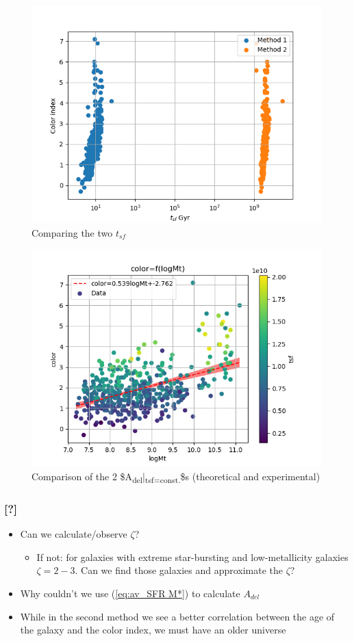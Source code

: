 \documentclass[a4paper,twocolumn]{article}
\begin{document}
\begin{figure}[!htpb]
\centering
\includegraphics[width=.9\linewidth]{./figs/tsf_tsf2.png}
\caption{\label{fig:Comparing the two $t_{sf}$}Comparing the two \(t_{sf}\)}
\end{figure}
\begin{figure}[!htpb]
\centering
\includegraphics[width=.9\linewidth]{./figs/logMt-color-color_tsf.png}
\caption{\label{fig:A_theor_A_exp_tsf}Comparison of the 2 \$A\textsubscript{del}|\textsubscript{tsf=const.}\$s (theoretical and experimental)}
\end{figure}

\subsubsection{[?]}
\label{sec:org88e1de2}
\begin{itemize}
\item Can we calculate/observe \(\zeta\)?
\begin{itemize}
\item If not: for galaxies with extreme star-bursting and low-metallicity galaxies \(\zeta=2-3\). Can we find those galaxies and approximate the \(\zeta\)?
\end{itemize}
\item Why couldn't we use (\ref{eq:av_SFR M*}) to calculate \(A_{del}\)
\item While in the second method we see a better correlation between the age of the galaxy and the color index, we must have an older universe
\end{itemize}
\end{document}
